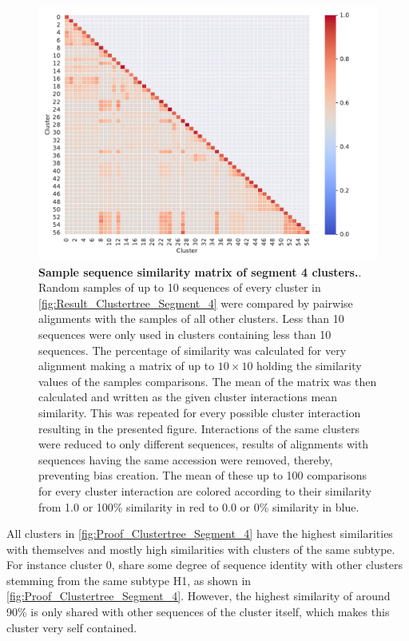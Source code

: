 \begin{figure}[!hbt]
    \centering
    \includegraphics[width=\textwidth]{Results/Cluster_Difference_Segment_4.pdf}
    \caption[Sample sequence similarity matrix of segment 4 clusters]{\textbf{Sample sequence similarity matrix of segment 4 clusters.}. Random samples of up to 10 sequences of every cluster in \autoref{fig:Result_Clustertree_Segment_4} were compared by pairwise alignments with the samples of all other clusters. Less than 10 sequences were only used in clusters containing less than 10 sequences. The percentage of similarity was calculated for very alignment making a matrix of up to $10\times10$ holding the similarity values of the samples comparisons. The mean of the matrix was then calculated and written as the given cluster interactions mean similarity. This was repeated for every possible cluster interaction resulting in the presented figure. Interactions of the same clusters were reduced to only different sequences, results of alignments with sequences having the same accession were removed, thereby, preventing bias creation. The mean of these up to 100 comparisons for every cluster interaction are colored according to their similarity from 1.0 or 100\% similarity in red to 0.0 or 0\% similarity in blue.}
    \label{fig:Proof_Clustertree_Segment_4}
\end{figure}

All clusters in \autoref{fig:Proof_Clustertree_Segment_4} have the highest similarities with themselves and mostly high similarities with clusters of the same subtype. For instance cluster 0, share some degree of sequence identity with other clusters stemming from the same subtype H1, as shown in \autoref{fig:Proof_Clustertree_Segment_4}. However, the highest similarity of around 90\% is only shared with other sequences of the cluster itself, which makes this cluster very self contained. 

